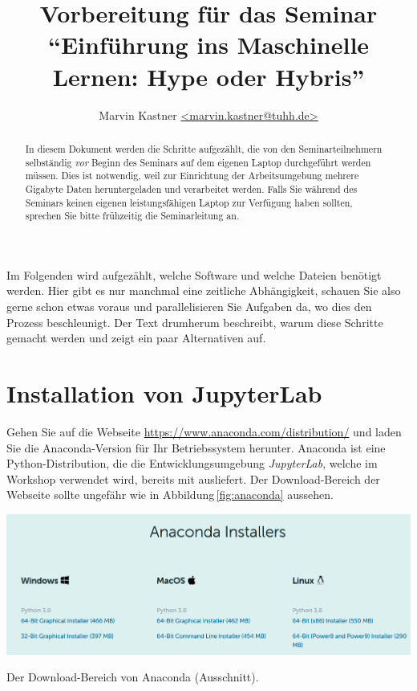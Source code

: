 \documentclass{tufte-handout}
\title{Vorbereitung für das Seminar \enquote{Einführung ins Maschinelle Lernen: Hype oder Hybris}}
\author{Marvin Kastner \href{mailto:marvin.kastner@tuhh.de}{<marvin.kastner@tuhh.de>}}
\begin{document}
\maketitle%

\begin{abstract}
\noindent
In diesem Dokument werden die Schritte aufgezählt, die von den Seminarteilnehmern selbständig \emph{vor} Beginn des Seminars auf dem eigenen Laptop durchgeführt werden müssen.
Dies ist notwendig, weil zur Einrichtung der Arbeitsumgebung mehrere Gigabyte Daten heruntergeladen und verarbeitet werden.
Falls Sie während des Seminars keinen eigenen leistungsfähigen Laptop zur Verfügung haben sollten, sprechen Sie bitte frühzeitig die Seminarleitung an.
\end{abstract}

Im Folgenden wird aufgezählt, welche Software und welche Dateien benötigt werden.
Hier gibt es nur manchmal eine zeitliche Abhängigkeit, schauen Sie also gerne schon etwas voraus und parallelisieren Sie Aufgaben da, wo dies den Prozess beschleunigt.
Der Text drumherum beschreibt, warum diese Schritte gemacht werden und zeigt ein paar Alternativen auf.


\section{Installation von JupyterLab}

Gehen Sie auf die Webseite
\url{https://www.anaconda.com/distribution/} 
und laden Sie die Anaconda-Version für Ihr Betriebssystem herunter.
Anaconda ist eine Python-Distribution, die die Entwicklungsumgebung \emph{JupyterLab}, welche im Workshop verwendet wird, bereits mit ausliefert.
Der Download-Bereich der Webseite sollte ungefähr wie in Abbildung\,\ref{fig:anaconda} aussehen.

\begin{marginfigure}
  \includegraphics{anaconda}
  \caption{Der Download-Bereich von Anaconda (Ausschnitt).}%
\label{fig:anaconda}
\end{marginfigure}
\end{document}
